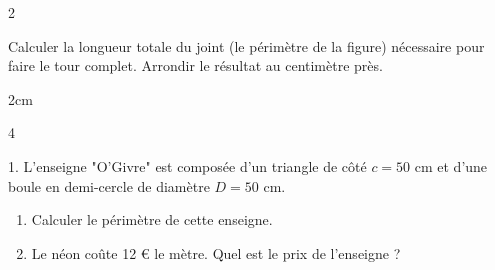 \documentclass[a4paper]{book}
\begin{document}
{\begin{exerciceNote}{2}
\begin{minipage}{0.6\linewidth}
            Calculer la longueur totale du joint (le périmètre de la figure) nécessaire pour faire le tour complet. Arrondir le résultat au centimètre près.

            \begin{ZoneReponse}{2cm}
            \end{ZoneReponse}
        \end{minipage}
        \hfill
        \begin{minipage}{0.35\linewidth}
            \begin{center}
            \end{center}
        \end{minipage}
    \end{exerciceNote}


    \begin{exerciceNote}{4}
        \begin{minipage}{0.8\linewidth}
            1. L'enseigne "O'Givre" est composée d'un triangle de côté $c = 50$ cm et d'une boule en demi-cercle de diamètre $D = 50$ cm.
            \begin{enumerate}[leftmargin=*, label=\alph*.]
                \item Calculer le périmètre de cette enseigne.
                \item Le néon coûte 12 € le mètre. Quel est le prix de l'enseigne ?
            \end{enumerate}


\end{minipage}
\end{exerciceNote}}
\end{document}
